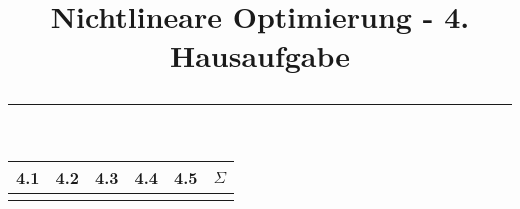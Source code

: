 \documentclass[11p,a4paper]{article}
\begin{document}
\title{\textbf{Nichtlineare Optimierung - 4. Hausaufgabe} \\ \rule{\textwidth}{1pt}}
\date{}

\clearpage\maketitle
\thispagestyle{empty}
\ourtitle
\setcounter{page}{0}


\vspace{2.5cm}
\begin{center}
\huge
\begin{tabular}{c*{4}{|c}||c}
4.1 & 4.2 & 4.3 & 4.4 & 4.5 & $\Sigma$ \\\hline
&&&&& \\
\end{tabular}
\end{center}
\vspace{2cm}







%
\end{document}
